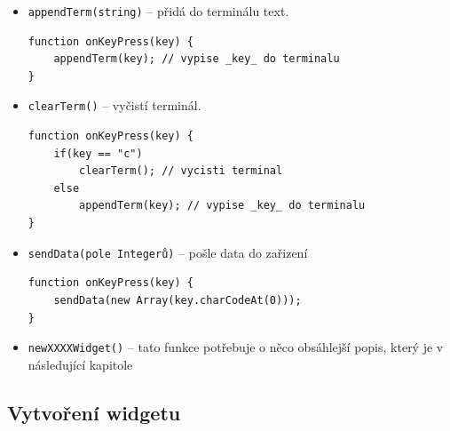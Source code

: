 \documentclass[12pt, a4paper, oneside]{article}
\begin{document}
\begin{itemize}
    \item {\color{blue}\verb/appendTerm(string)/} -- přidá do terminálu text.\\
        \noindent\begin{minipage}{\textwidth}
        \begin{lstlisting}[caption=Vypsání stisknutých kláves do terminálu]
function onKeyPress(key) {
    appendTerm(key); // vypise _key_ do terminalu
}
        \end{lstlisting}
        \end{minipage}

    \item {\color{blue}\verb/clearTerm()/} -- vyčistí terminál.\\
        \noindent\begin{minipage}{\textwidth}
        \begin{lstlisting}[caption=Vypsání stisknutých kláves do terminálu a jeho vyčištění po stisku klávesy C]
function onKeyPress(key) {
    if(key == "c")
        clearTerm(); // vycisti terminal
    else
        appendTerm(key); // vypise _key_ do terminalu
}
        \end{lstlisting}
        \end{minipage}

    \item {\color{blue}\verb/sendData(pole Integerů)/} -- pošle data do zařizení\\
        \noindent\begin{minipage}{\textwidth}
        \begin{lstlisting}[caption=Poslání ASCII kódu stisknuté klávesy]
function onKeyPress(key) {
    sendData(new Array(key.charCodeAt(0)));
}
        \end{lstlisting}
        \end{minipage}

    \item {\color{blue}\verb/newXXXXWidget()/} -- tato funkce potřebuje o něco obsáhlejší popis, který je v následující kapitole
\end{itemize}

\subsection*{Vytvoření widgetu}
\end{document}
